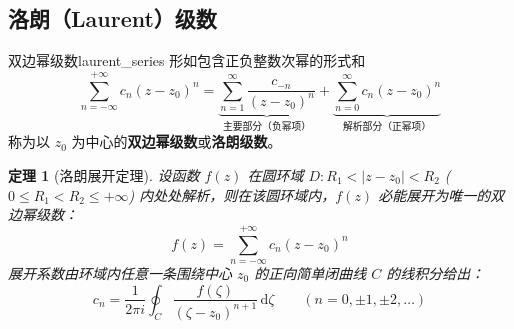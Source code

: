 \documentclass[11pt,a4paper,fontset=fandol]{ctexart}
\newtheorem{theorem}{定理}[section]
\theoremstyle{remark}
\begin{document}
\subsection{洛朗（Laurent）级数}

\begin{definition}{双边幂级数}{laurent_series}
形如包含正负整数次幂的形式和
\begin{equation}
    \sum_{n=-\infty}^{+\infty} c_n (z - z_0)^n = \underbrace{\sum_{n=1}^\infty \frac{c_{-n}}{(z - z_0)^n}}_{\text{主要部分（负幂项）}} + \underbrace{\sum_{n=0}^\infty c_n (z - z_0)^n}_{\text{解析部分（正幂项）}}
\end{equation}
称为以 $z_0$ 为中心的\textbf{双边幂级数}或\textbf{洛朗级数}。
\end{definition}

\begin{theorem}[洛朗展开定理]
设函数 $f(z)$ 在圆环域 $D: R_1 < |z - z_0| < R_2$ ($0 \le R_1 < R_2 \le +\infty$) 内处处解析，则在该圆环域内，$f(z)$ 必能展开为唯一的双边幂级数：
\begin{equation}
    f(z) = \sum_{n=-\infty}^{+\infty} c_n (z - z_0)^n
\end{equation}
展开系数由环域内任意一条围绕中心 $z_0$ 的正向简单闭曲线 $C$ 的线积分给出：
\begin{equation}
    c_n = \frac{1}{2\pi i} \oint_C \frac{f(\zeta)}{(\zeta - z_0)^{n+1}}\,\mathrm{d}\zeta \qquad (n = 0, \pm 1, \pm 2, \dots)
\end{equation}
\end{theorem}
\end{document}
